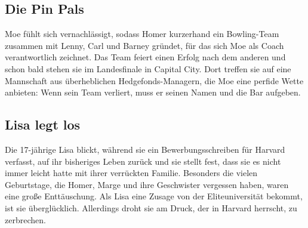 
\subsection{Die Pin Pals}
Moe fühlt sich vernachlässigt, sodass Homer kurzerhand ein Bowling-Team zusammen mit Lenny, Carl und Barney gründet, für das sich Moe als Coach verantwortlich zeichnet. Das Team feiert einen Erfolg nach dem anderen und schon bald stehen sie im Landesfinale in Capital City. Dort treffen sie auf eine Mannschaft aus überheblichen Hedgefonds-Managern, die Moe eine perfide Wette anbieten: Wenn sein Team verliert, muss er seinen Namen und die Bar aufgeben.


\subsection{Lisa legt los}\label{XABF01}
Die 17-jährige Lisa blickt, während sie ein Bewerbungsschreiben für Harvard verfasst, auf ihr bisheriges Leben zurück und sie stellt fest, dass sie es nicht immer leicht hatte mit ihrer verrückten Familie. Besonders die vielen Geburtstage, die Homer, Marge und ihre Geschwister vergessen haben, waren eine große Enttäuschung. Als Lisa eine Zusage von der Eliteuniversität bekommt, ist sie überglücklich. Allerdings droht sie am Druck, der in Harvard herrscht, zu zerbrechen.

